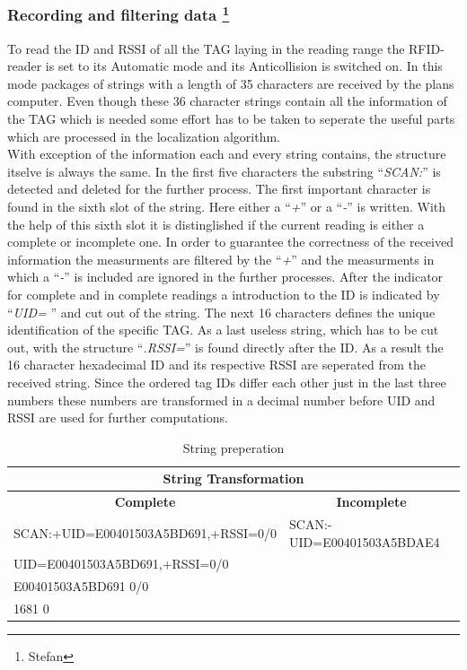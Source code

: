\subsubsection[Recording and filtering data]{Recording and filtering data \footnote{Stefan}}
To read the ID and RSSI of all the TAG laying in the reading range the RFID-reader is set to its Automatic mode and its Anticollision is switched on. In this mode packages of strings with a length of 35 characters are received by the plans computer. Even though these 36 character strings contain all the information of the TAG which is needed some effort has to be taken to seperate the useful parts which are processed in the localization algorithm.\\
With exception of the information each and every string contains, the structure itselve is always the same. In the first five characters the substring ``\textit{SCAN:}'' is detected and deleted for the further process. The first important character is found in the sixth slot of the string. Here either a ``\textit{+}'' or a ``\textit{-}'' is written. With the help of this sixth slot it is distinglished if the current reading is either a complete or incomplete one. In order to guarantee the correctness of the received information the measurments are filtered by the ``\textit{+}'' and the measurments in which a ``\textit{-}'' is included are ignored in the further processes. After the indicator for complete and in complete readings a introduction to the ID is indicated by  ``\textit{UID=} '' and cut out of the string. The next 16 characters defines the unique identification of the specific TAG. As a last useless string, which has to be cut out, with the structure ``\textit{.RSSI=}'' is found directly after the ID. As a result the 16 character hexadecimal ID and its respective RSSI are seperated from the received string. Since the ordered tag IDs differ each other just in the last three numbers these numbers are transformed in a decimal number before UID and RSSI are used for further computations.\\
\begin{table}[!htbp]
\centering
\begin{tabular}{|l|l|}
\hline
\multicolumn{2}{|c|}{\textbf{String Transformation}}                               \\ \hline
\multicolumn{1}{|c|}{\textbf{Complete}} & \multicolumn{1}{c|}{\textbf{Incomplete}} \\ \hline
SCAN:+UID=E00401503A5BD691,+RSSI=0/0    & SCAN:-UID=E00401503A5BDAE4               \\ \hline
UID=E00401503A5BD691,+RSSI=0/0          &                                          \\ \hline
E00401503A5BD691 0/0                    &                                          \\ \hline
1681 0                                  &                                          \\ \hline
\end{tabular}
\caption{String preperation}
\label{string_prep}
\end{table}

